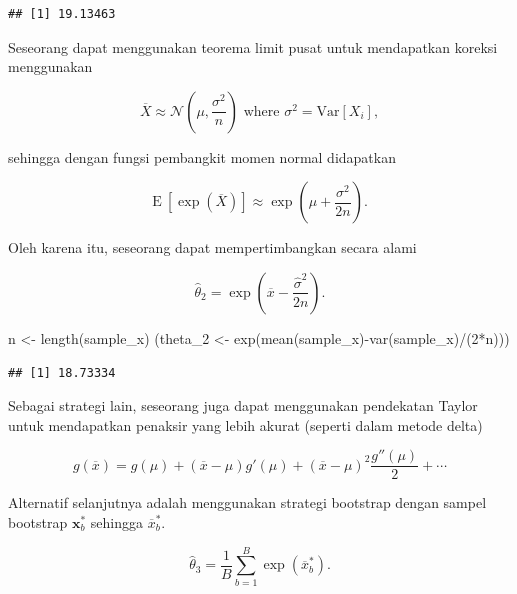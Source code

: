 \documentclass[
]{book}
\newenvironment{Shaded}{\begin{snugshade}}{\end{snugshade}}
\newcommand{\AttributeTok}[1]{\textcolor[rgb]{0.77,0.63,0.00}{#1}}
\newcommand{\ControlFlowTok}[1]{\textcolor[rgb]{0.13,0.29,0.53}{\textbf{#1}}}
\newcommand{\DecValTok}[1]{\textcolor[rgb]{0.00,0.00,0.81}{#1}}
\newcommand{\FunctionTok}[1]{\textcolor[rgb]{0.00,0.00,0.00}{#1}}
\newcommand{\NormalTok}[1]{#1}
\newcommand{\OtherTok}[1]{\textcolor[rgb]{0.56,0.35,0.01}{#1}}
\newcommand{\SpecialCharTok}[1]{\textcolor[rgb]{0.00,0.00,0.00}{#1}}
\begin{document}
\begin{verbatim}
## [1] 19.13463
\end{verbatim}

Seseorang dapat menggunakan teorema limit pusat untuk mendapatkan koreksi menggunakan

\[\overline{X}\approx\mathcal{N}\left(\mu,\frac{\sigma^2}{n}\right)\text{ where }\sigma^2=\text{Var}[X_i] ,\]

sehingga dengan fungsi pembangkit momen normal didapatkan

\[\mathrm{E}~\left[\exp(\overline{X})\right] \approx \exp\left(\mu+\frac{\sigma^2}{2n}\right) .\]

Oleh karena itu, seseorang dapat mempertimbangkan secara alami

\[\widehat{\theta}_2=\exp\left(\overline{x}-\frac{\widehat{\sigma}^2}{2n}\right) .\]

\begin{Shaded}
\begin{Highlighting}[]
\NormalTok{n }\OtherTok{\textless{}{-}} \FunctionTok{length}\NormalTok{(sample\_x)}
\NormalTok{(theta\_2 }\OtherTok{\textless{}{-}} \FunctionTok{exp}\NormalTok{(}\FunctionTok{mean}\NormalTok{(sample\_x)}\SpecialCharTok{{-}}\FunctionTok{var}\NormalTok{(sample\_x)}\SpecialCharTok{/}\NormalTok{(}\DecValTok{2}\SpecialCharTok{*}\NormalTok{n)))}
\end{Highlighting}
\end{Shaded}

\begin{verbatim}
## [1] 18.73334
\end{verbatim}

Sebagai strategi lain, seseorang juga dapat menggunakan pendekatan Taylor untuk mendapatkan penaksir yang lebih akurat (seperti dalam metode delta)

\[g(\overline{x})=g(\mu)+(\overline{x}-\mu)g'(\mu)+(\overline{x}-\mu)^2\frac{g''(\mu)}{2}+\cdots\]

Alternatif selanjutnya adalah menggunakan strategi bootstrap dengan sampel bootstrap \(\mathbf{x}^{\ast}_{b}\) sehingga \(\overline{x}^{\ast}_{b}\).

\[\widehat{\theta}_3=\frac{1}{B}\sum_{b=1}^B\exp(\overline{x}^{\ast}_{b}) .\]

\begin{Shaded}
\end{Shaded}
\end{document}
